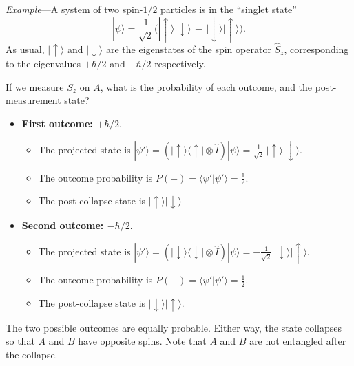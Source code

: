\documentclass[pra,12pt]{revtex4-2}
\begin{document}
\begin{framed}
\noindent
\textit{Example}---A system of two spin-$1/2$ particles is in
the ``singlet state''
\begin{equation}
  |\psi\rangle = \frac{1}{\sqrt{2}} \Big(|\!\uparrow\rangle|\!\downarrow\rangle \,-\, |\!\downarrow\rangle|\!\uparrow\rangle\Big).
\end{equation}
As usual, $|\!\uparrow\rangle$ and $|\!\downarrow\rangle$ are the
eigenstates of the spin operator $\hat{S}_z$, corresponding to the
eigenvalues $+\hbar/2$ and $-\hbar/2$ respectively.

If we measure $S_z$ on $A$, what is the probability of each outcome,
and the post-measurement state?

\begin{itemize}
  \label{box:eproutcomes}
\item \textbf{First outcome: $+\hbar/2$}.
  \begin{itemize}
  \item The projected state is $\displaystyle |\psi'\rangle = \left(|\!\uparrow\rangle\langle\uparrow| \otimes \hat{I}\right)|\psi\rangle = 
    \frac{1}{\sqrt{2}}\,|\!\uparrow\rangle|\!\downarrow\rangle$.
  \item The outcome probability is $\displaystyle
    P(+) = \langle \psi'|\psi'\rangle = \frac{1}{2}$.
  \item The post-collapse state is $\displaystyle |\!\uparrow\rangle |\!\downarrow\rangle$
  \end{itemize}

\item \textbf{Second outcome: $-\hbar/2$}.
  \begin{itemize}
  \item The projected state is $\displaystyle |\psi'\rangle = \left(|\!\downarrow\rangle\langle\downarrow| \otimes \hat{I}\right)|\psi\rangle = 
    -\frac{1}{\sqrt{2}}\,|\!\downarrow\rangle|\!\uparrow\rangle$.
  \item The outcome probability is $\displaystyle P(-) = \langle \psi'|\psi'\rangle =
    \frac{1}{2}$.
  \item The post-collapse state is $\displaystyle |\!\downarrow\rangle |\!\uparrow\rangle$.
  \end{itemize}
\end{itemize}
The two possible outcomes are equally probable.  Either way, the state
collapses so that $A$ and $B$ have opposite spins.  Note that $A$ and
$B$ are not entangled after the collapse.
\end{framed}
\end{document}
